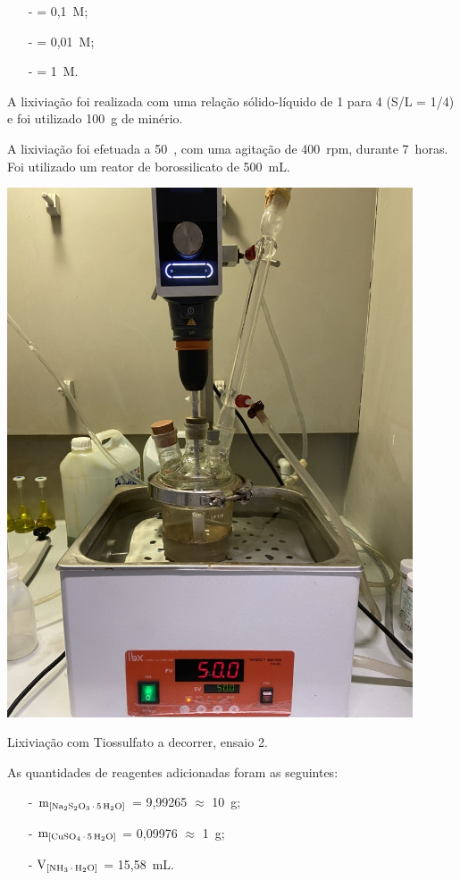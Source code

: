 \begin{itemize}
    \item[-] \tsp{} = 0,1~M;
    \item[-] \sulfcu{} = 0,01~M;
    \item[-] \amo{} = 1~M.
\end{itemize}

A lixiviação foi realizada com uma relação sólido-líquido de 1 para 4 (S/L = 1/4) e foi utilizado 100~g de minério.

A lixiviação foi efetuada a 50~\graus{}, com uma agitação de 400~rpm, durante 7~horas.
Foi utilizado um reator de borossilicato de 500~mL.

\begin{marginfigure}[2cm]
    \centering
    \includegraphics[width=0.9\textwidth]{figures/Lixiviação com Tiossulfato - ensaio 2}
    \caption{Lixiviação com Tiossulfato a decorrer, ensaio 2.}
    \label{fig:lix-tiossulfato2}
\end{marginfigure}

As quantidades de reagentes adicionadas foram as seguintes:

\begin{itemize}
    \item[-] $\mathrm{m}_{\left[\tsp{}\right]}$ = 9,99265 $\approx$ 10~g;
    \item[-] $\mathrm{m}_{\left[\sulfcu{}\right]}$ = 0,09976 $\approx$ 1~g;
    \item[-] $\mathrm{V}_{\left[\amo{}\right]}$ = 15,58~mL.
\end{itemize}

